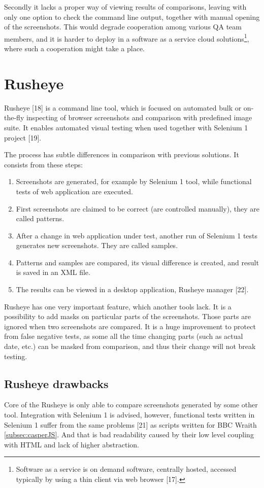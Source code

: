 \documentclass[11pt,oneside,final]{fithesis2}
\begin{document}
   Secondly it lacks a proper way of viewing results of comparisons, leaving with only one option to check the command line output, together with manual opening of the screenshots. This would degrade
   cooperation among various QA team members, and it is harder to deploy in a software as a service cloud solutions\footnote{Software as a service is on demand software, centrally hosted, 
   accessed typically by using a thin client via web browser [17].}, where such a cooperation might take a place.

  \section{Rusheye}
  Rusheye [18] is a command line tool, which is focused on automated bulk or on-the-fly inspecting of browser screenshots and comparison with predefined image suite. It enables automated
  visual testing when used together with Selenium 1 project [19].
  
  The process has subtle differences in comparison with previous solutions. It consists from these steps:
  
  \begin{enumerate}
   \item Screenshots are generated, for example by Selenium 1 tool, while functional tests of web application are executed.
   \item First screenshots are claimed to be correct (are controlled manually), they are called patterns.
   \item After a change in web application under test, another run of Selenium 1 tests generates new screenshots. They are called samples.
   \item Patterns and samples are compared, its visual difference is created, and result is saved in an XML file.
   \item The results can be viewed in a desktop application, Rusheye manager [22].
  \end{enumerate}
  
  Rusheye has one very important feature, which another tools lack. It is a possibility to add masks on particular parts of the screenshots. Those parts are ignored when two screenshots are
  compared. It is a huge improvement to protect from false negative tests, as some all the time changing parts (such as actual date, etc.) can be masked from comparison, and thus their change
  will not break testing.
  
  \subsection{Rusheye drawbacks}
  Core of the Rusheye is only able to compare screenshots generated by some other tool. Integration with Selenium 1 is advised, however, functional tests written in Selenium 1 suffer
  from the same problems [21] as scripts written for BBC Wraith \ref{subsec:casperJS}. And that is bad readability caused by their low level coupling with HTML and lack of higher abstraction.
  
\end{document}
